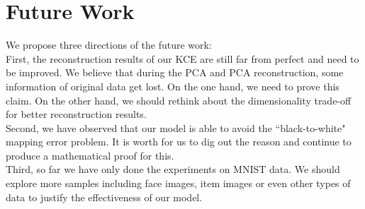 \documentclass[12pt]{report} %
\begin{document}
\section{Future Work}
We propose three directions of the future work:\\
First, the reconstruction results of our KCE are still far from perfect and need to be improved. We believe that during the PCA and PCA reconstruction, some information of original data get lost. On the one hand, we need to prove this claim. On the other hand, we should rethink about the dimensionality trade-off for better reconstruction results.\\
Second, we have observed that our model is able to avoid the ``black-to-white" mapping error problem. It is worth for us to dig out the reason and continue to produce a mathematical proof for this.\\
Third, so far we have only done the experiments on MNIST data. We should explore more samples including face images, item images or even other types of data to justify the effectiveness of our model.
\end{document}

